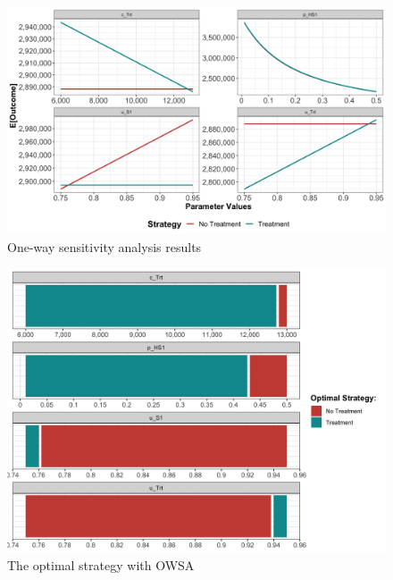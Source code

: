 \documentclass[]{book}
\begin{document}
\begin{figure}

{\centering \includegraphics[width=41.67in]{../figs/05a_owsa_nmb} 

}

\caption{One-way sensitivity analysis results}\label{fig:05a-owsa-nmb}
\end{figure}

\begin{figure}

{\centering \includegraphics[width=33.33in]{../figs/05a_optimal_owsa_nmb} 

}

\caption{The optimal strategy with OWSA}\label{fig:05a-optimal-owsa-nmb}
\end{figure}
\end{document}
